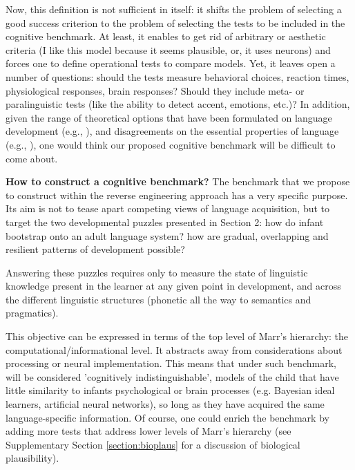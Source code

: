 \documentclass[jou,apacite]{apa6}
\renewcommand{\subsubsection}[1]{\textbf{#1}\hspace{0.3cm}}
\begin{document}
Now, this definition is not sufficient in itself: it shifts  the problem of selecting a good success criterion to the problem of selecting the tests to be included in the cognitive benchmark. At least, it enables to get rid of arbitrary or aesthetic criteria (I like this model because it seems plausible, or, it uses neurons) and forces one to define operational tests to compare models. Yet, it leaves open a number of questions:  should the tests measure behavioral choices, reaction times, physiological responses, brain responses? Should they include meta- or paralinguistic tests (like the ability to detect accent, emotions, etc.)? In addition, given the range of theoretical options that have been formulated on language development (e.g., ), and disagreements on the essential properties of language (e.g.,  ), one would think our proposed cognitive benchmark will be difficult to come about. 

\subsubsection{How to construct a cognitive benchmark?} The benchmark that we propose to construct within the reverse engineering approach has a very specific purpose. Its aim is not to tease apart competing views of language acquisition, but to target the two developmental puzzles presented in Section 2: how do infant bootstrap onto an adult language system?  how are gradual, overlapping and resilient patterns of development possible? 

Answering these puzzles requires only to measure the state of linguistic knowledge present in the learner at any given point in development, and across the different linguistic structures (phonetic all the way to semantics and pragmatics).

This objective can be expressed in terms of the top level of Marr's hierarchy: the computational/informational level. It abstracts away from considerations about processing or neural implementation. 
This means that under such benchmark, will be considered 'cognitively indistinguishable', models of the child that have little similarity to infants psychological or brain processes (e.g. Bayesian ideal learners, artificial neural networks), so long as they have acquired the same language-specific information. Of course, one could enrich the benchmark by adding more tests that address lower levels of Marr's hierarchy (see Supplementary Section \ref{section:bioplaus} for a discussion of biological plausibility).
\end{document}
